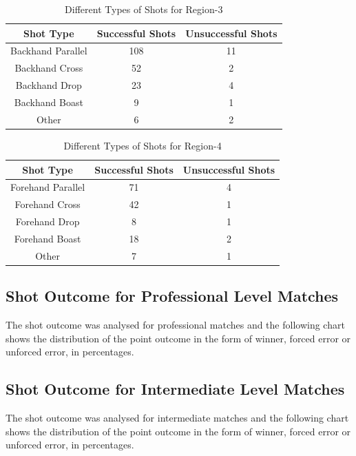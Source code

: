 \documentclass[10pt,conference]{IEEEtran}
\begin{document}
\begin{table}[h!]
\centering
\begin{tabular}{||c c c||} 
 \hline
 Shot Type & Successful Shots & Unsuccessful Shots \\ [0.5ex]
 \hline\hline
 Backhand Parallel & 108 & 11  \\ 
 Backhand Cross & 52 & 2  \\
 Backhand Drop & 23 & 4  \\
 Backhand Boast & 9 & 1  \\
 Other & 6 & 2  \\ [1ex] 
 \hline
\end{tabular}
\caption{Different Types of Shots for Region-3}

\end{table}
\begin{table}[h!]
\centering
\begin{tabular}{||c c c||} 
 \hline
 Shot Type & Successful Shots & Unsuccessful Shots \\ [0.5ex]
 \hline\hline
 Forehand Parallel & 71 & 4  \\ 
 Forehand Cross & 42 & 1  \\
 Forehand Drop & 8 & 1  \\
 Forehand Boast & 18 & 2  \\
 Other & 7 & 1  \\ [1ex] 
 \hline
\end{tabular}
\caption{Different Types of Shots for Region-4}
\end{table}

\subsection{Shot Outcome for Professional Level Matches}
The shot outcome was analysed for professional matches and the following chart shows the distribution of the point outcome in the form of winner, forced error or unforced error, in percentages.

\subsection{Shot Outcome for Intermediate Level Matches}
The shot outcome was analysed for intermediate matches and the following chart shows the distribution of the point outcome in the form of winner, forced error or unforced error, in percentages.
\end{document}
